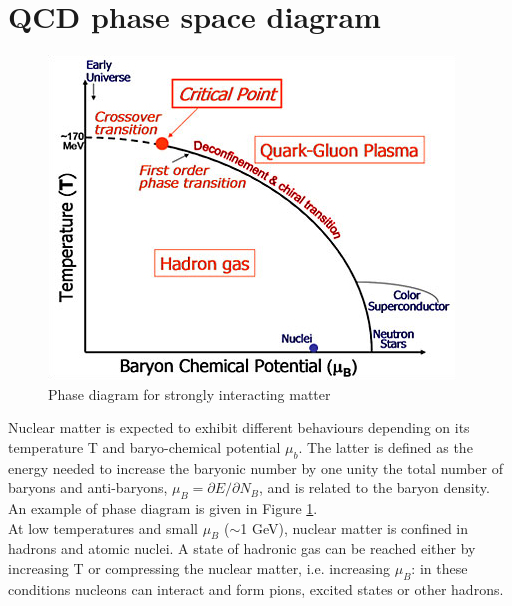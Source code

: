 \section{QCD phase space diagram}
%
\begin{figure}
  \centering
  \includegraphics[scale=0.5]{figures/phase.jpg}
  \caption{Phase diagram for strongly interacting matter}
  \label{fig:phase}
\end{figure}
%
Nuclear matter is expected to exhibit different behaviours depending on its temperature T and baryo-chemical potential $\mu_{b}$. The latter is defined
as the energy needed to increase the baryonic number by one unity the total number of baryons and anti-baryons, $\mu_{B}= \partial E / \partial N_{B}$, and is related to the baryon density. An example of phase diagram is given in Figure \ref{fig:phase}.\\ At low temperatures and small $\mu_{B}$ ($\sim$1 GeV), nuclear matter is confined in hadrons and atomic nuclei. A state of hadronic gas can be reached either by increasing T or compressing the nuclear matter, i.e. increasing $\mu_{B}$: in these conditions nucleons can interact and form pions, excited states or other hadrons.

